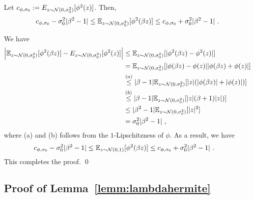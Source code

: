\begin{prop}
Let $c_{\phi,\sigma_0} := E_{z\sim {\cal N}(0,\sigma_0^2)}[\phi^2(z)]$. Then,
\begin{align*}
c_{\phi,\sigma_0} - \sigma_0^2 |\beta^2 -1 | \leq \mathbb{E}_{z \sim {\cal N}(0,\sigma_0^2)}[ \phi^2(\beta z)] \leq c_{\phi,\sigma_0} + \sigma_0^2 |\beta^2 -1| ~.
\end{align*}
\label{prop:gauss2}
\end{prop}
\proof We have 
\begin{align*}
\left| \mathbb{E}_{z\sim {\cal N}(0,\sigma_0^2)} [\phi^2( \beta z)] -  E_{z\sim {\cal N}(0,\sigma_0^2)}[\phi^2(z)] \right| 
& \leq  \mathbb{E}_{z\sim {\cal N}(0,\sigma_0^2)}[|\phi^2 (\beta z) - \phi^2(z)|] \\
& = \mathbb{E}_{z\sim {\cal N}(0,\sigma_0^2)}[|\phi(\beta z) -  \phi(z)| |\phi(\beta z) + \phi(z)|] \\ 
& \overset{(a)}{\leq} |\beta - 1| \mathbb{E}_{z\sim {\cal N}(0,\sigma_0^2)}[| z| (|\phi(\beta z)| + |\phi(z)|)] \\
& \overset{(b)}{\leq} |\beta - 1| \mathbb{E}_{z \sim {\cal N}(0,\sigma_0^2)} [|z| (\beta+1)|z|)] \\
&\leq |\beta^2 - 1| \mathbb{E}_{z \sim {\cal N}(0,\sigma_0^2)} [|z|^2] \\
& = \sigma_0^2 |\beta^2 - 1|  ~,
\end{align*}
where (a) and (b) follows from the $1$-Lipschitzness of $\phi$. As a result, we have 
\begin{align*}
c_{\phi,\sigma_0} - \sigma_0^2 |\beta^2-1| & \leq  \mathbb{E}_{z\sim {\cal N}(0,1)} [\phi^2( \beta z) ] \leq c_{\phi,\sigma_0} +  \sigma_0^2 |\beta^2-1| ~.
\end{align*}
This completes the proof. \qed 




\subsection{Proof of Lemma~\ref{lemm:lambdahermite}}
\label{ssec:lambdahermite}

